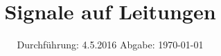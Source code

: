 

\subject{V52}
\title{Signale auf Leitungen}
\date{
  Durchführung: 4.5.2016
  \hspace{3em}
  Abgabe: \today
}



\maketitle
\thispagestyle{empty}
\tableofcontents
\newpage



% 


\printbibliography

\appendix
%


